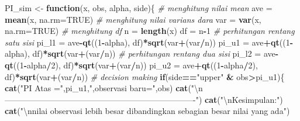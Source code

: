 \documentclass[]{book}
\newenvironment{Shaded}{\begin{snugshade}}{\end{snugshade}}
\newcommand{\KeywordTok}[1]{\textcolor[rgb]{0.13,0.29,0.53}{\textbf{#1}}}
\newcommand{\DataTypeTok}[1]{\textcolor[rgb]{0.13,0.29,0.53}{#1}}
\newcommand{\DecValTok}[1]{\textcolor[rgb]{0.00,0.00,0.81}{#1}}
\newcommand{\CharTok}[1]{\textcolor[rgb]{0.31,0.60,0.02}{#1}}
\newcommand{\StringTok}[1]{\textcolor[rgb]{0.31,0.60,0.02}{#1}}
\newcommand{\CommentTok}[1]{\textcolor[rgb]{0.56,0.35,0.01}{\textit{#1}}}
\newcommand{\OtherTok}[1]{\textcolor[rgb]{0.56,0.35,0.01}{#1}}
\newcommand{\ControlFlowTok}[1]{\textcolor[rgb]{0.13,0.29,0.53}{\textbf{#1}}}
\newcommand{\OperatorTok}[1]{\textcolor[rgb]{0.81,0.36,0.00}{\textbf{#1}}}
\newcommand{\NormalTok}[1]{#1}
\begin{document}
\begin{Shaded}
\begin{Highlighting}[]
\NormalTok{PI_sim <-}\StringTok{ }\ControlFlowTok{function}\NormalTok{(x, obs, alpha, side)\{}
  \CommentTok{# menghitung nilai mean}
\NormalTok{  ave =}\StringTok{ }\KeywordTok{mean}\NormalTok{(x, }\DataTypeTok{na.rm=}\OtherTok{TRUE}\NormalTok{)}
  \CommentTok{# menghitung nilai varians dara}
\NormalTok{  var =}\StringTok{ }\KeywordTok{var}\NormalTok{(x, }\DataTypeTok{na.rm=}\OtherTok{TRUE}\NormalTok{)}
  \CommentTok{# menghitung df}
\NormalTok{  n =}\StringTok{ }\KeywordTok{length}\NormalTok{(x)}
\NormalTok{  df =}\StringTok{ }\NormalTok{n}\OperatorTok{-}\DecValTok{1}
  \CommentTok{# perhitungan rentang satu sisi}
\NormalTok{  pi_l1 =}\StringTok{ }\NormalTok{ave}\OperatorTok{-}\KeywordTok{qt}\NormalTok{((}\DecValTok{1}\OperatorTok{-}\NormalTok{alpha), df)}\OperatorTok{*}\KeywordTok{sqrt}\NormalTok{(var}\OperatorTok{+}\NormalTok{(var}\OperatorTok{/}\NormalTok{n))}
\NormalTok{  pi_u1 =}\StringTok{ }\NormalTok{ave}\OperatorTok{+}\KeywordTok{qt}\NormalTok{((}\DecValTok{1}\OperatorTok{-}\NormalTok{alpha), df)}\OperatorTok{*}\KeywordTok{sqrt}\NormalTok{(var}\OperatorTok{+}\NormalTok{(var}\OperatorTok{/}\NormalTok{n))}
  \CommentTok{# perhitungan rentang dua sisi}
\NormalTok{  pi_l2 =}\StringTok{ }\NormalTok{ave}\OperatorTok{-}\KeywordTok{qt}\NormalTok{((}\DecValTok{1}\OperatorTok{-}\NormalTok{alpha}\OperatorTok{/}\DecValTok{2}\NormalTok{), df)}\OperatorTok{*}\KeywordTok{sqrt}\NormalTok{(var}\OperatorTok{+}\NormalTok{(var}\OperatorTok{/}\NormalTok{n))}
\NormalTok{  pi_u2 =}\StringTok{ }\NormalTok{ave}\OperatorTok{+}\KeywordTok{qt}\NormalTok{((}\DecValTok{1}\OperatorTok{-}\NormalTok{alpha}\OperatorTok{/}\DecValTok{2}\NormalTok{), df)}\OperatorTok{*}\KeywordTok{sqrt}\NormalTok{(var}\OperatorTok{+}\NormalTok{(var}\OperatorTok{/}\NormalTok{n))}
  \CommentTok{# decision making}
  \ControlFlowTok{if}\NormalTok{(side}\OperatorTok{==}\StringTok{"upper"} \OperatorTok{&}\StringTok{ }\NormalTok{obs}\OperatorTok{>}\NormalTok{pi_u1)\{}
    \KeywordTok{cat}\NormalTok{(}\StringTok{"PI Atas ="}\NormalTok{,pi_u1,}\StringTok{",observasi baru="}\NormalTok{,obs)}
    \KeywordTok{cat}\NormalTok{(}\StringTok{"}\CharTok{\textbackslash{}n}\StringTok{----------------------------------------------------------------------"}\NormalTok{)}
    \KeywordTok{cat}\NormalTok{(}\StringTok{"}\CharTok{\textbackslash{}n}\StringTok{Kesimpulan:"}\NormalTok{)}
    \KeywordTok{cat}\NormalTok{(}\StringTok{"}\CharTok{\textbackslash{}n}\StringTok{nilai observasi lebih besar dibandingkan sebagian besar nilai yang ada"}\NormalTok{)}

\end{Highlighting}
\end{Shaded}
\end{document}
